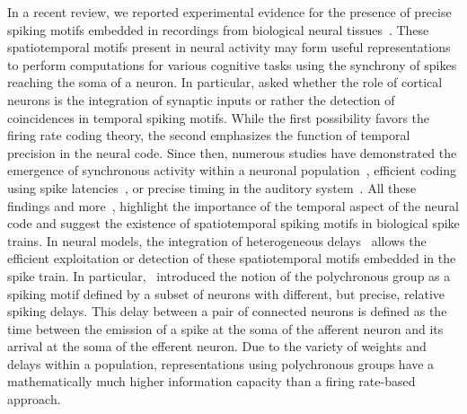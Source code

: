 \documentclass[default]{sn-jnl}%
\theoremstyle{thmstyleone}%
\theoremstyle{thmstyletwo}%
\theoremstyle{thmstylethree}%
\begin{document}
In a recent review, we reported experimental evidence for the presence of precise spiking motifs embedded in recordings from biological neural tissues~\cite{grimaldi_precise_2023}. These spatiotemporal motifs present in neural activity may form useful representations to perform computations for various cognitive tasks using the synchrony of spikes reaching the soma of a neuron. In particular, \citet{abeles_role_1982} asked whether the role of cortical neurons is the integration of synaptic inputs or rather the detection of coincidences in temporal spiking motifs. While the first possibility favors the firing rate coding theory, the second emphasizes the function of temporal precision in the neural code. Since then, numerous studies have demonstrated the emergence of synchronous activity within a neuronal population~\citep{riehle_spike_1997, davis_spontaneous_2021}, efficient coding using spike latencies~\citep{perrinet_coding_2004, gollisch_rapid_2008}, or precise timing in the auditory system~\citep{deweese_binary_2002, carr_circuit_1990}. All these findings and more~\citep{bohte_evidence_2004}, highlight the importance of the temporal aspect of the neural code and suggest the existence of spatiotemporal spiking motifs in biological spike trains. In neural models, the integration of heterogeneous delays~\citep{guise_bayesian_2014, zhang_supervised_2020, nadafian_bio-plausible_2020} allows the efficient exploitation or detection of these spatiotemporal motifs embedded in the spike train. In particular,~\citet{izhikevich_polychronization_2006} introduced the notion of the polychronous group as a spiking motif defined by a subset of neurons with different, but precise, relative spiking delays. This delay between a pair of connected neurons is defined as the time between the emission of a spike at the soma of the afferent neuron and its arrival at the soma of the efferent neuron. Due to the variety of weights and delays within a population, representations using polychronous groups have a mathematically much higher information capacity than a firing rate-based approach.
\end{document}
